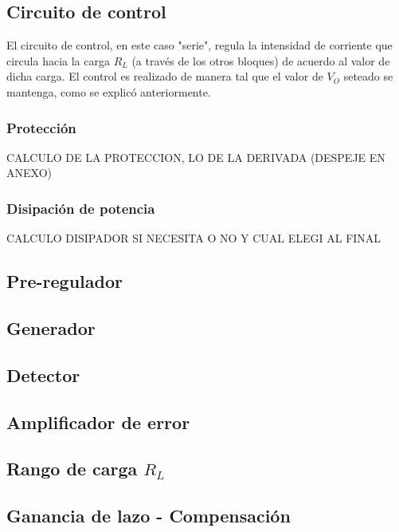 \subsection{Circuito de control}

El circuito de control, en este caso "serie", regula la intensidad de corriente que circula hacia la carga $R_L$ (a trav\'es de los otros bloques) de acuerdo al valor de dicha carga. El control es realizado de manera tal que el valor de $V_O$ seteado se mantenga, como se explic\'o anteriormente.

\subsubsection{Protecci\'on}

CALCULO DE LA PROTECCION, LO DE LA DERIVADA (DESPEJE EN ANEXO)

\subsubsection{Disipaci\'on de potencia}

CALCULO DISIPADOR SI NECESITA O  NO Y CUAL ELEGI AL FINAL

\subsection{Pre-regulador}

\subsection{Generador}

\subsection{Detector}

\subsection{Amplificador de error}

\subsection{Rango de carga $R_L$}

\subsection{Ganancia de lazo - Compensaci\'on}

